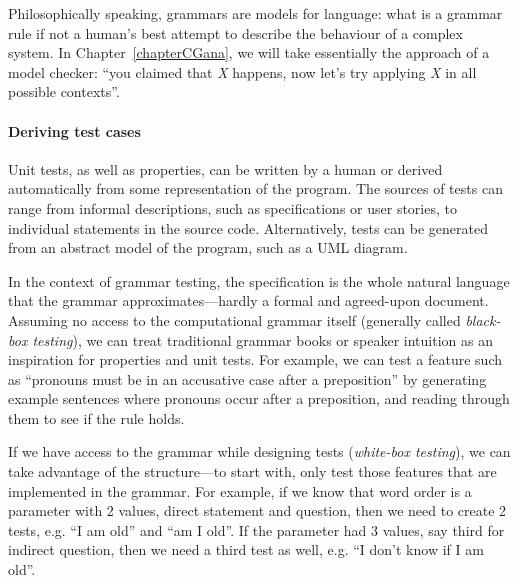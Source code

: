 Philosophically speaking, grammars are models for language: what is a grammar rule
if not a human's best attempt to describe the behaviour of a complex system.
In Chapter~\ref{chapterCGana}, we will take essentially the approach of a model
checker: ``you claimed that \emph{X} happens, now let's try applying \emph{X}
in all possible contexts''.




\paragraph{Deriving test cases}

Unit tests, as well as properties, can be written by a human or
derived automatically from some representation of the program. The
sources of tests can range from informal descriptions, such as
specifications or user stories, to individual statements in the source
code. Alternatively, tests can be generated from an abstract model of
the program, such as a UML diagram.

In the context of grammar testing, the specification is the whole
natural language that the grammar approximates---hardly a formal and
agreed-upon document. Assuming no access to the computational grammar
itself (generally called \emph{black-box testing}), we can treat traditional
grammar books or speaker intuition as an inspiration for properties
and unit tests. For example, we can test a feature such as ``pronouns
must be in an accusative case after a preposition'' by generating
example sentences where pronouns occur after a preposition, and
reading through them to see if the rule holds.

If we have access to the grammar while designing tests
(\emph{white-box testing}), we can take advantage of the
structure---to start with, only test those features that are
implemented in the grammar. For example, if we know that word order is
a parameter with 2 values, direct statement and question,
then we need to create 2 tests, e.g. ``I am old'' and ``am I
old''. If the parameter had 3 values, say third for indirect question,
then we need a third test as well, e.g. ``I don't know if I am old''.

